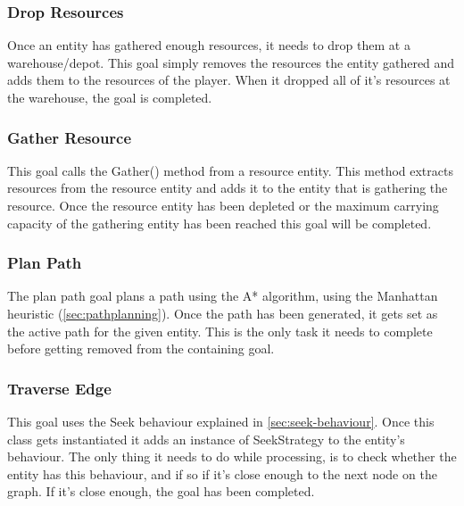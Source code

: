 \subsubsection{Drop Resources}
\label{sec:dropresources}
Once an entity has gathered enough resources, it needs to drop them at a 
warehouse/depot. This goal simply removes the resources the entity gathered and adds them to the resources of the player. When it dropped all of it's resources at the warehouse, the goal is completed.

\subsubsection{Gather Resource}
\label{sec:gatherresource}
This goal calls the Gather() method from a resource entity. This method extracts resources from the resource entity and adds it to the entity that is gathering the resource. Once the resource entity has been depleted or the maximum carrying capacity of the gathering entity has been reached this goal will be completed.

\subsubsection{Plan Path}
\label{sec:planpath}
The plan path goal plans a path using the A* algorithm, using the Manhattan 
heuristic (\cref{sec:pathplanning}). Once the path has been generated, it gets set as the active path 
for the given entity. This is the only task it needs to complete before 
getting removed from the containing goal.

\subsubsection{Traverse Edge}
\label{sec:traverseedge}
This goal uses the Seek behaviour explained in \cref{sec:seek-behaviour}. Once 
this class gets instantiated it adds an instance of SeekStrategy to the 
entity's behaviour. The only thing it needs to do while processing, is 
to check whether the entity has this behaviour, and if so if it's close 
enough to the next node on the graph. If it's close enough, the goal has been 
completed.

